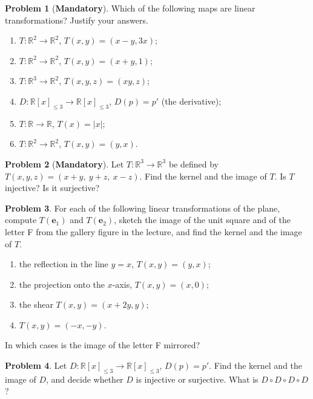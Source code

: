 \documentclass[11pt]{article}
\theoremstyle{definition}
\newtheorem{problem}{Problem}[section]
\newcommand{\mandatory}{\textcolor{red!70!black}{\textbf{Mandatory}}}
\begin{document}
\begin{problem}[\mandatory]\label{pr:linear}
    Which of the following maps are linear transformations? Justify your answers.
    \begin{enumerate}[label=(\alph*)]
        \item $T: \mathbb{R}^2 \to \mathbb{R}^2$, $T(x, y) = (x - y, 3x)$;
        \item $T: \mathbb{R}^2 \to \mathbb{R}^2$, $T(x, y) = (x + y, 1)$;
        \item $T: \mathbb{R}^3 \to \mathbb{R}^2$, $T(x, y, z) = (xy, z)$;
        \item $D: \mathbb{R}[x]_{\leq 3} \to \mathbb{R}[x]_{\leq 3}$, $D(p) = p'$ (the derivative);
        \item $T: \mathbb{R} \to \mathbb{R}$, $T(x) = |x|$;
        \item $T: \mathbb{R}^2 \to \mathbb{R}^2$, $T(x, y) = (y, x)$.
    \end{enumerate}
\end{problem}

\begin{problem}[\mandatory]\label{pr:kerim}
    Let $T: \mathbb{R}^3 \to \mathbb{R}^3$ be defined by $T(x, y, z) = (x + y, \ y + z, \ x - z)$. Find the kernel and the image of $T$. Is $T$ injective? Is it surjective?
\end{problem}

\begin{problem}\label{pr:gallery}
    For each of the following linear transformations of the plane, compute $T(\mathbf{e}_1)$ and $T(\mathbf{e}_2)$, sketch the image of the unit square and of the letter F from the gallery figure in the lecture, and find the kernel and the image of $T$.
    \begin{enumerate}[label=(\alph*)]
        \item the reflection in the line $y = x$, $T(x, y) = (y, x)$;
        \item the projection onto the $x$-axis, $T(x, y) = (x, 0)$;
        \item the shear $T(x, y) = (x + 2y, y)$;
        \item $T(x, y) = (-x, -y)$.
    \end{enumerate}
    In which cases is the image of the letter F mirrored?
\end{problem}

\begin{problem}\label{pr:derivative}
    Let $D: \mathbb{R}[x]_{\leq 3} \to \mathbb{R}[x]_{\leq 3}$, $D(p) = p'$. Find the kernel and the image of $D$, and decide whether $D$ is injective or surjective. What is $D \circ D \circ D \circ D$?
\end{problem}
\end{document}

